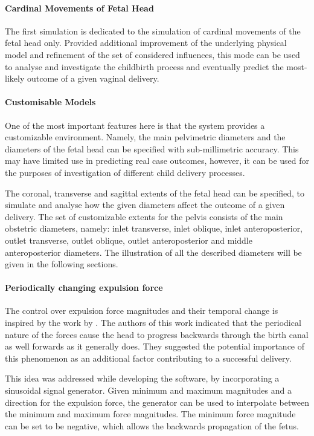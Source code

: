 \paragraph{Cardinal Movements of Fetal Head}
The first simulation is dedicated to the simulation of cardinal movements of the fetal head only. Provided additional improvement of the underlying physical model and refinement of the set of considered influences, this mode can be used to analyse and investigate the childbirth process and eventually predict the most-likely outcome of a given vaginal delivery.


\paragraph{Customisable Models}
One of the most important features here is that the system provides a customizable environment. Namely, the main pelvimetric diameters and the diameters of the fetal head can be specified with sub-millimetric accuracy. This may have limited use in predicting real case outcomes, however, it can be used for the purposes of investigation of different child delivery processes.

The coronal, transverse and sagittal extents of the fetal head can be specified, to simulate and analyse how the given diameters affect the outcome of a given delivery. The set of customizable extents for the pelvis consists of the main obstetric diameters, namely: inlet transverse, inlet oblique, inlet anteroposterior, outlet transverse, outlet oblique, outlet anteroposterior and middle anteroposterior diameters. The illustration of all the described diameters will be given in the following sections.

\paragraph{Periodically changing expulsion force}
The control over expulsion force magnitudes and their temporal change is inspired by the work by \citet{Moreau}. The authors of this work indicated that the periodical nature of the forces cause the head to progress backwards through the birth canal as well forwards as it generally does. They suggested the potential importance of this phenomenon as an additional factor contributing to a successful delivery.

This idea was addressed while developing the software, by incorporating a sinusoidal signal generator. Given minimum and maximum magnitudes and a direction for the expulsion force, the generator can be used to interpolate between the minimum and maximum force magnitudes. The minimum force magnitude can be set to be negative, which allows the backwards propagation of the fetus.

